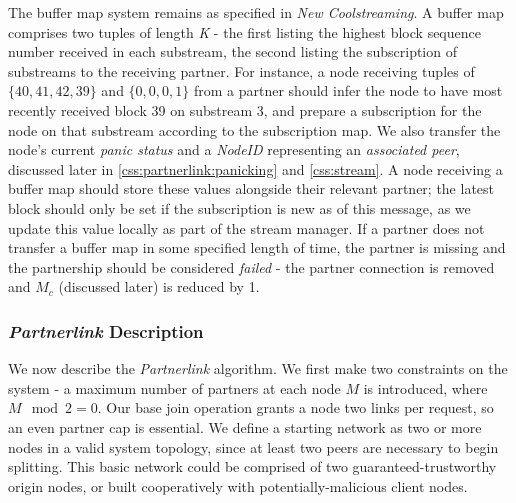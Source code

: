 \documentclass[12pt,a4paper]{article}
\begin{document}
The buffer map system remains as specified in \textit{New Coolstreaming}. A buffer map comprises two tuples of length \textit{K} - the first listing the highest block sequence number received in each substream, the second listing the subscription of substreams to the receiving partner. For instance, a node receiving tuples of \(\{40, 41, 42, 39\}\) and \(\{0, 0, 0, 1\}\) from a partner should infer the node to have most recently received block 39 on substream 3, and prepare a subscription for the node on that substream according to the subscription map. We also transfer the node's current \textit{panic status} and a \textit{NodeID} representing an \textit{associated peer}, discussed later in \ref{css:partnerlink:panicking} and \ref{css:stream}. A node receiving a buffer map should store these values alongside their relevant partner; the latest block should only be set if the subscription is new as of this message, as we update this value locally as part of the stream manager. If a partner does not transfer a buffer map in some specified length of time, the partner is missing and the partnership should be considered \textit{failed} - the partner connection is removed and \(M_c\) (discussed later) is reduced by 1.

\subsubsection{\textit{Partnerlink} Description} \label{css:partnerlink:description}
We now describe the \textit{Partnerlink} algorithm. We first make two constraints on the system - a maximum number of partners at each node \(M\) is introduced, where \(M\mod{2} = 0\). Our base join operation grants a node two links per request, so an even partner cap is essential. We define a starting network as two or more nodes in a valid system topology, since at least two peers are necessary to begin splitting. This basic network could be comprised of two guaranteed-trustworthy origin nodes, or built cooperatively with potentially-malicious client nodes.

\end{document}
